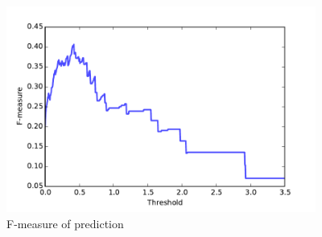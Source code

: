\documentclass[11pt]{article}
\begin{document}
\begin{figure}[hbt]
\begin{center}
  \includegraphics[width=4in]{graph/fmeasure.pdf}
  \caption{F-measure of prediction}
  \label{fm}
\end{center}  
\end{figure}
\end{document}
